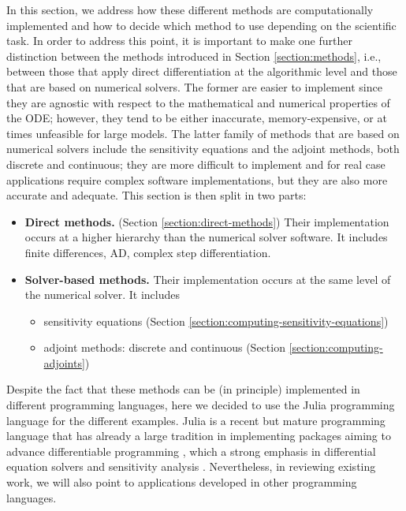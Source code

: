 
In this section, we address how these different methods are computationally implemented and how to decide which method to use depending on the scientific task.
In order to address this point, it is important to make one further distinction between the methods introduced in Section \ref{section:methods}, i.e., between those that apply direct differentiation at the algorithmic level and those that are based on numerical solvers.  
%
The former are easier to implement since they are agnostic with respect to the mathematical and numerical properties of the ODE; however, they tend to be either inaccurate, memory-expensive, or at times unfeasible for large models. 
The latter family of methods that are based on numerical solvers include the sensitivity equations and the adjoint methods, both discrete and continuous; they are more difficult to implement and for real case applications require complex software implementations, but they are also more accurate and adequate. 
This section is then split in two parts:
\begin{itemize}
    \item \textbf{Direct methods.} (Section \ref{section:direct-methods}) Their implementation occurs at a higher hierarchy than the numerical solver software. It includes finite differences, AD, complex step differentiation.
    \item \textbf{Solver-based methods.} Their implementation occurs at the same level of the numerical solver. It includes 
    \begin{itemize}
        \item sensitivity equations (Section \ref{section:computing-sensitivity-equations})
        \item adjoint methods: discrete and continuous (Section \ref{section:computing-adjoints})
    \end{itemize}
\end{itemize}
Despite the fact that these methods can be (in principle) implemented in different programming languages, here we decided to use the Julia programming language for the different examples. 
Julia is a recent but mature programming language that has already a large tradition in implementing packages aiming to advance differentiable programming \cite{Bezanson_Karpinski_Shah_Edelman_2012, Julialang_2017}, which a strong emphasis in differential equation solvers \cite{Rackauckas_Nie_2016} and sensitivity analysis \cite{rackauckas2020universal}.
Nevertheless, in reviewing existing work, we will also point to applications developed in other programming languages.